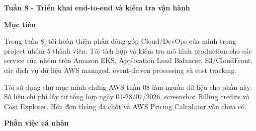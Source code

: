 \vspace{0.5em}\noindent\textbf{Tuần 8 - Triển khai end-to-end và kiểm tra vận
hành}\par

\vspace{0.5em}\noindent\textbf{Mục tiêu}\par

Trong tuần 8, tôi hoàn thiện phần đóng góp Cloud/DevOps của mình trong
project nhóm 5 thành viên. Tôi tích hợp và kiểm tra mô hình production
cho các service của nhóm trên Amazon EKS, Application Load Balancer,
S3/CloudFront, các dịch vụ dữ liệu AWS managed, event-driven processing
và cost tracking.

Tôi sử dụng thư mục minh chứng AWS tuần 08 làm nguồn dữ liệu cho phần
này. Số liệu chi phí lấy từ tổng hợp ngày 01-28/07/2026, screenshot
Billing credits và Cost Explorer. Hóa đơn tháng đã chốt và AWS Pricing
Calculator vẫn chưa có.

\vspace{0.5em}\noindent\textbf{Phần việc cá nhân}\par

